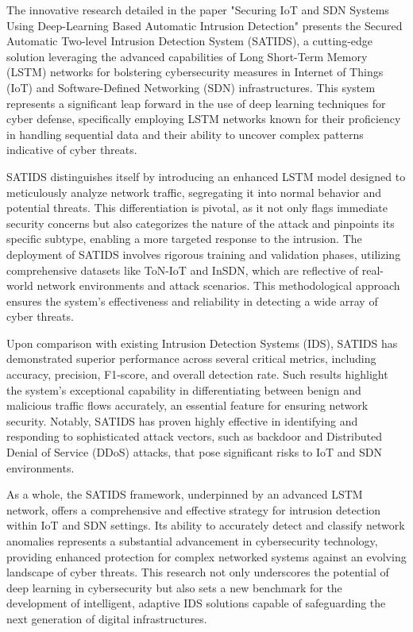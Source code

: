 \par 
The innovative research detailed in the paper "Securing IoT and SDN Systems Using Deep-Learning Based Automatic Intrusion Detection" presents the Secured Automatic Two-level Intrusion Detection System (SATIDS), a cutting-edge solution leveraging the advanced capabilities of Long Short-Term Memory (LSTM) networks for bolstering cybersecurity measures in Internet of Things (IoT) and Software-Defined Networking (SDN) infrastructures. This system represents a significant leap forward in the use of deep learning techniques for cyber defense, specifically employing LSTM networks known for their proficiency in handling sequential data and their ability to uncover complex patterns indicative of cyber threats.\par 
SATIDS distinguishes itself by introducing an enhanced LSTM model designed to meticulously analyze network traffic, segregating it into normal behavior and potential threats. This differentiation is pivotal, as it not only flags immediate security concerns but also categorizes the nature of the attack and pinpoints its specific subtype, enabling a more targeted response to the intrusion. The deployment of SATIDS involves rigorous training and validation phases, utilizing comprehensive datasets like ToN-IoT and InSDN, which are reflective of real-world network environments and attack scenarios. This methodological approach ensures the system's effectiveness and reliability in detecting a wide array of cyber threats.\par 
Upon comparison with existing Intrusion Detection Systems (IDS), SATIDS has demonstrated superior performance across several critical metrics, including accuracy, precision, F1-score, and overall detection rate. Such results highlight the system's exceptional capability in differentiating between benign and malicious traffic flows accurately, an essential feature for ensuring network security. Notably, SATIDS has proven highly effective in identifying and responding to sophisticated attack vectors, such as backdoor and Distributed Denial of Service (DDoS) attacks, that pose significant risks to IoT and SDN environments.\par 
As a whole, the SATIDS framework, underpinned by an advanced LSTM network, offers a comprehensive and effective strategy for intrusion detection within IoT and SDN settings. Its ability to accurately detect and classify network anomalies represents a substantial advancement in cybersecurity technology, providing enhanced protection for complex networked systems against an evolving landscape of cyber threats. This research not only underscores the potential of deep learning in cybersecurity but also sets a new benchmark for the development of intelligent, adaptive IDS solutions capable of safeguarding the next generation of digital infrastructures\cite{ELSAYED2023102211}.
